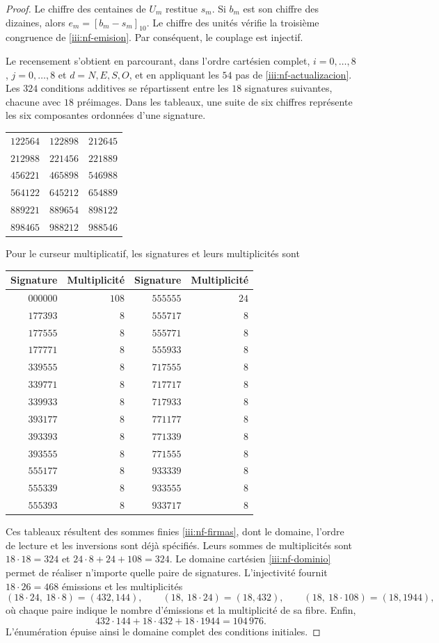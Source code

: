 \begin{proof}
Le chiffre des centaines de $U_m$ restitue $s_m$. Si $b_m$ est son chiffre des
dizaines, alors $e_m=[b_m-s_m]_{10}$. Le chiffre des unités vérifie
la troisième congruence de \eqref{iii:nf-emision}. Par conséquent, le
couplage est injectif.

Le recensement s’obtient en parcourant, dans l’ordre cartésien complet,
$i=0,\ldots,8$, $j=0,\ldots,8$ et $d=N,E,S,O$, et en appliquant les $54$
pas de \eqref{iii:nf-actualizacion}. Les $324$ conditions additives
se répartissent entre les $18$ signatures suivantes, chacune avec $18$
préimages. Dans les tableaux, une suite de six chiffres représente
les six composantes ordonnées d’une signature.
\begin{center}
\begin{tabular}{ccc}
$122564$&$122898$&$212645$\\
$212988$&$221456$&$221889$\\
$456221$&$465898$&$546988$\\
$564122$&$645212$&$654889$\\
$889221$&$889654$&$898122$\\
$898465$&$988212$&$988546$
\end{tabular}
\end{center}
Pour le curseur multiplicatif, les signatures et leurs multiplicités sont
\begin{center}
\begin{tabular}{rr@{\qquad}rr}
Signature&Multiplicité&Signature&Multiplicité\\ \hline
$000000$&$108$&$555555$&$24$\\
$177393$&$8$&$555717$&$8$\\
$177555$&$8$&$555771$&$8$\\
$177771$&$8$&$555933$&$8$\\
$339555$&$8$&$717555$&$8$\\
$339771$&$8$&$717717$&$8$\\
$339933$&$8$&$717933$&$8$\\
$393177$&$8$&$771177$&$8$\\
$393393$&$8$&$771339$&$8$\\
$393555$&$8$&$771555$&$8$\\
$555177$&$8$&$933339$&$8$\\
$555339$&$8$&$933555$&$8$\\
$555393$&$8$&$933717$&$8$
\end{tabular}
\end{center}
Ces tableaux résultent des sommes finies \eqref{iii:nf-firmas}, dont le
domaine, l’ordre de lecture et les inversions sont déjà spécifiés. Leurs sommes
de multiplicités sont $18\cdot18=324$ et
$24\cdot8+24+108=324$. Le domaine cartésien
\eqref{iii:nf-dominio} permet de réaliser n’importe quelle paire de signatures.
L’injectivité fournit $18\cdot26=468$ émissions et les
multiplicités
\[
 (18\cdot24,\ 18\cdot8)=(432,144),\qquad
 (18,\ 18\cdot24)=(18,432),\qquad
 (18,\ 18\cdot108)=(18,1944),
\]
où chaque paire indique le nombre d’émissions et la multiplicité de sa fibre.
Enfin,
\[
 432\cdot144+18\cdot432+18\cdot1944=104\,976.
\]
L’énumération épuise ainsi le domaine complet des conditions initiales.
\end{proof}

